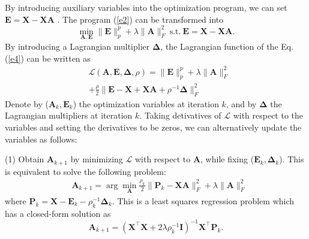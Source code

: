 \documentclass[10pt,twocolumn,letterpaper]{article}
\begin{document}
By introducing auxiliary variables into the optimization program, we can set 
$
\bm{E}
=
\bm{X}
-
\bm{X}\bm{A}
$ 
.
The program (\ref{e2}) can be transformed into
\begin{equation}
\label{e3}
\min_{\bm{A},\bm{E}}
\|
\bm{E}
\|_{p}^{p}
+
\lambda
\|
\bm{A}
\|_{F}^{2}
\ 
\text{s.t.}
\ 
\bm{E}=\bm{X}-\bm{X}\bm{A}
.
\end{equation}
By introducing a Lagrangian multiplier $\bm{\Delta}$, the Lagrangian function of the Eq. (\ref{e4}) can be written as
\begin{equation}
\begin{split}
\label{e5}
&
\mathcal{L}
(\bm{A},\bm{E},\bm{\Delta},\rho)
=
\|
\bm{E}
\|_{p}^{p}
+
\lambda
\|
\bm{A}
\|_{F}^{2}
\\
&
+
\frac{\rho}{2}
\|
\bm{E}-\bm{X}+\bm{X}\bm{A}+\rho^{-1}\bm{\Delta}
\|_{F}^{2}
\end{split}
\end{equation}
Denote by ($\bm{A}_{k},\bm{E}_{k}$) the optimization variables at iteration $k$, and by $\bm{\Delta}$ the Lagrangian multipliers at iteration $k$. Taking detivatives of $\mathcal{L}$ with respect to the variables and setting the derivatives to be zeros, we can alternatively update the variables as follows:

(1) Obtain $\bm{A}_{k+1}$ by minimizing $\mathcal{L}$ with respect to $\bm{A}$, while fixing ($\bm{E}_{k},\bm{\Delta}_{k}$). This is equivalent to solve the following problem:
\begin{equation}
\begin{split}
\label{e8}
&
\bm{A}_{k+1}
=
\arg\min_{\bm{A}}
\frac{\rho_{k}}{2}
\|
\bm{P}_{k}-\bm{X}\bm{A}
\|_{F}^{2}
+
\lambda
\|
\bm{A}
\|_{F}^{2}
\end{split}
\end{equation}
where $\bm{P}_{k}=\bm{X}-\bm{E}_{k}-\rho_{k}^{-1}\bm{\Delta}_{k}$. This is a least squares regression problem which has a closed-form solution as 
\begin{equation}
\label{e7}
\bm{A}_{k+1} 
=
(\bm{X}^{\top}\bm{X}+2\lambda\rho_{k}^{-1}\bm{I})^{-1}
\bm{X}^{\top}\bm{P}_{k}.
\end{equation}
\end{document}
